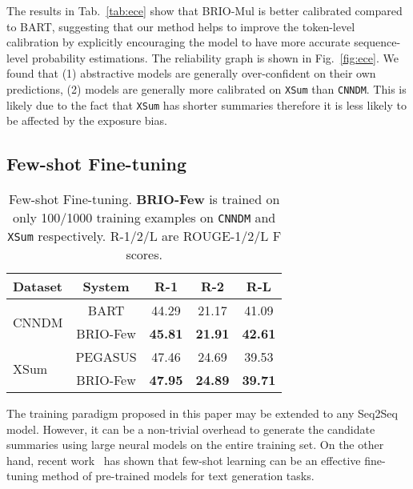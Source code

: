 \documentclass[11pt]{article}
\newcommand{\model}{BRIO\xspace}
\begin{document}
The results in Tab.~\ref{tab:ece} show that \model-Mul is better calibrated compared to BART, suggesting that our method helps to improve the token-level calibration by explicitly encouraging the model to have more accurate sequence-level probability estimations.
The reliability graph is shown in Fig.~\ref{fig:ece}.
We found that (1) abstractive models are generally over-confident on their own predictions, 
(2) models are generally more calibrated on \texttt{XSum} than \texttt{CNNDM}.
This is likely due to the fact that \texttt{XSum} has shorter summaries therefore it is less likely to be affected by the exposure bias. 





\subsection{Few-shot Fine-tuning}

\begin{table}
\centering
\small
\begin{tabular}{lcccc}
\toprule
\textbf{Dataset} & \textbf{System} & \textbf{R-1} & \textbf{R-2} & \textbf{R-L}  \\
\midrule
 \multirow{2}{*}{CNNDM} & BART & 44.29 & 21.17 & 41.09 \\
& \model-Few & \textbf{45.81} & \textbf{21.91} & \textbf{42.61} \\
\midrule
 \multirow{2}{*}{XSum} & PEGASUS & 47.46 & 24.69 & 39.53\\
& \model-Few & \textbf{47.95} & \textbf{24.89} & \textbf{39.71} \\
\bottomrule
\end{tabular}
\vspace{-5pt}
\caption{\label{tab:few-shot} Few-shot Fine-tuning.
\textbf{\model-Few} is trained on only 100/1000 training examples on \texttt{CNNDM} and \texttt{XSum} respectively.
R-1/2/L are ROUGE-1/2/L F scores.}
\vspace{-8pt}
\end{table}

The training paradigm proposed in this paper may be extended to any Seq2Seq model. 
However, it can be a non-trivial overhead to generate the candidate summaries using large neural models on the entire training set.
On the other hand, recent work~\citep{JMLR:v21:20-074, zhang2020pegasus, schick-schutze-2021-shot, fabbri-etal-2021-improving} has shown that few-shot learning can be an effective fine-tuning method of pre-trained models for text generation tasks.
\end{document}
